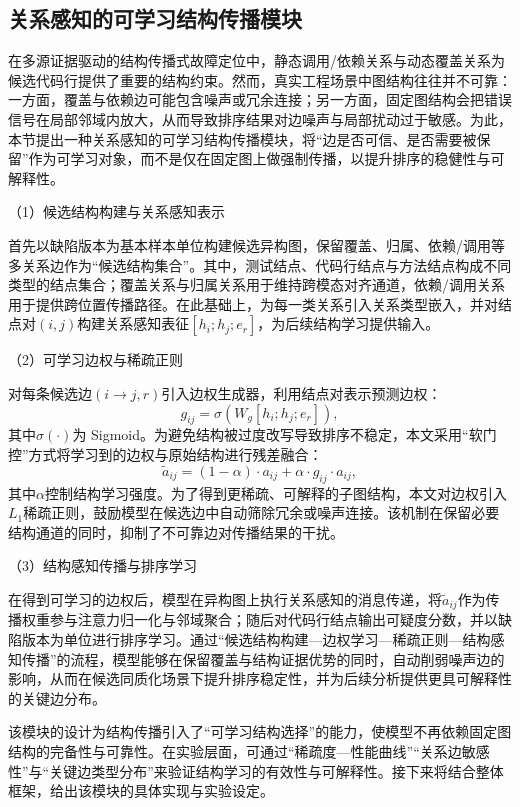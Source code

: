 \subsection{关系感知的可学习结构传播模块}

在多源证据驱动的结构传播式故障定位中，静态调用/依赖关系与动态覆盖关系为候选代码行提供了重要的结构约束。然而，真实工程场景中图结构往往并不可靠：一方面，覆盖与依赖边可能包含噪声或冗余连接；另一方面，固定图结构会把错误信号在局部邻域内放大，从而导致排序结果对边噪声与局部扰动过于敏感。为此，本节提出一种关系感知的可学习结构传播模块，将“边是否可信、是否需要被保留”作为可学习对象，而不是仅在固定图上做强制传播，以提升排序的稳健性与可解释性。

（1）候选结构构建与关系感知表示

首先以缺陷版本为基本样本单位构建候选异构图，保留覆盖、归属、依赖/调用等多关系边作为“候选结构集合”。其中，测试结点、代码行结点与方法结点构成不同类型的结点集合；覆盖关系与归属关系用于维持跨模态对齐通道，依赖/调用关系用于提供跨位置传播路径。在此基础上，为每一类关系引入关系类型嵌入，并对结点对\((i,j)\)构建关系感知表征\([h_i;h_j;e_r]\)，为后续结构学习提供输入。

（2）可学习边权与稀疏正则

对每条候选边\((i\!\rightarrow\!j,r)\)引入边权生成器，利用结点对表示预测边权：
\[
g_{ij}=\sigma\left(W_g [h_i;h_j;e_r]\right),
\]
其中\(\sigma(\cdot)\)为 Sigmoid。为避免结构被过度改写导致排序不稳定，本文采用“软门控”方式将学习到的边权与原始结构进行残差融合：
\[
\tilde{a}_{ij}=(1-\alpha)\cdot a_{ij}+\alpha\cdot g_{ij}\cdot a_{ij},
\]
其中\(\alpha\)控制结构学习强度。为了得到更稀疏、可解释的子图结构，本文对边权引入\(L_1\)稀疏正则，鼓励模型在候选边中自动筛除冗余或噪声连接。该机制在保留必要结构通道的同时，抑制了不可靠边对传播结果的干扰。

（3）结构感知传播与排序学习

在得到可学习的边权后，模型在异构图上执行关系感知的消息传递，将\(\tilde{a}_{ij}\)作为传播权重参与注意力归一化与邻域聚合；随后对代码行结点输出可疑度分数，并以缺陷版本为单位进行排序学习。通过“候选结构构建—边权学习—稀疏正则—结构感知传播”的流程，模型能够在保留覆盖与结构证据优势的同时，自动削弱噪声边的影响，从而在候选同质化场景下提升排序稳定性，并为后续分析提供更具可解释性的关键边分布。

该模块的设计为结构传播引入了“可学习结构选择”的能力，使模型不再依赖固定图结构的完备性与可靠性。在实验层面，可通过“稀疏度—性能曲线”“关系边敏感性”与“关键边类型分布”来验证结构学习的有效性与可解释性。接下来将结合整体框架，给出该模块的具体实现与实验设定。
